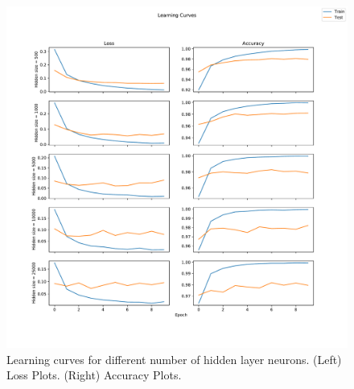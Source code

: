\documentclass[twocolumn]{article}
\begin{document}
\begin{figure}
    \centering
    \includegraphics[width=\linewidth]{Figures/learning_curves.pdf}
    \caption{Learning curves for different number of hidden layer neurons. (Left) Loss Plots. (Right) Accuracy Plots.}
    \label{fig:learning-curves}
\end{figure}
\end{document}
